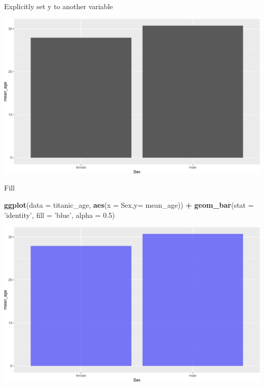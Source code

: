 \documentclass[
]{book}
\newenvironment{Shaded}{\begin{snugshade}}{\end{snugshade}}
\newcommand{\DataTypeTok}[1]{\textcolor[rgb]{0.13,0.29,0.53}{#1}}
\newcommand{\FloatTok}[1]{\textcolor[rgb]{0.00,0.00,0.81}{#1}}
\newcommand{\KeywordTok}[1]{\textcolor[rgb]{0.13,0.29,0.53}{\textbf{#1}}}
\newcommand{\NormalTok}[1]{#1}
\newcommand{\OperatorTok}[1]{\textcolor[rgb]{0.81,0.36,0.00}{\textbf{#1}}}
\newcommand{\OtherTok}[1]{\textcolor[rgb]{0.56,0.35,0.01}{#1}}
\newcommand{\StringTok}[1]{\textcolor[rgb]{0.31,0.60,0.02}{#1}}
\begin{document}
Explicitly set y to another variable

\begin{Shaded}
\end{Shaded}

\includegraphics{figures/unnamed-chunk-142-1.pdf}

Fill

\begin{Shaded}
\begin{Highlighting}[]
\KeywordTok{ggplot}\NormalTok{(}\DataTypeTok{data =}\NormalTok{ titanic_age, }\KeywordTok{aes}\NormalTok{(}\DataTypeTok{x =}\NormalTok{ Sex,}\DataTypeTok{y=}\NormalTok{ mean_age)) }\OperatorTok{+}\StringTok{ }\KeywordTok{geom_bar}\NormalTok{(}\DataTypeTok{stat =} \StringTok{'identity'}\NormalTok{, }\DataTypeTok{fill =} \StringTok{'blue'}\NormalTok{, }\DataTypeTok{alpha =} \FloatTok{0.5}\NormalTok{) }
\end{Highlighting}
\end{Shaded}

\includegraphics{figures/unnamed-chunk-143-1.pdf}
\end{document}
